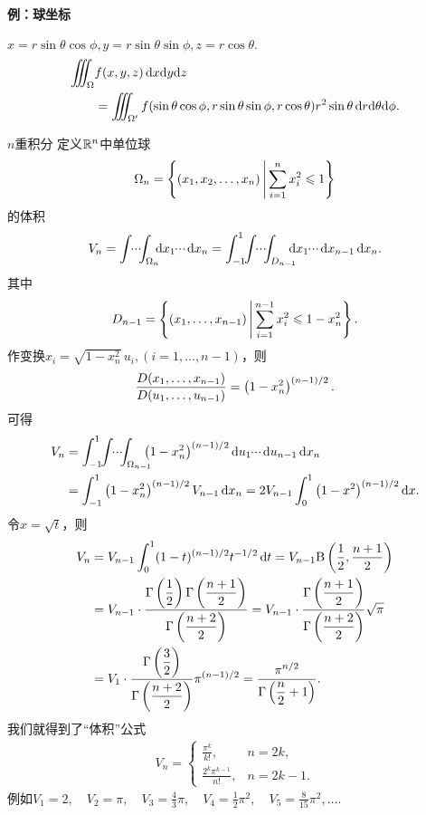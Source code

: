\paragraph{例：球坐标}$x=r\sin\theta\cos\phi,y=r\sin\theta\sin\phi,z=r\cos\theta.$
\begin{align*}
	\inttt_\Omega & f(x,y,z)\d x\nd y\nd z                                                                                   \\
				  & =\inttt_{\Omega'}f(\sin\theta\cos\phi,r\sin\theta\sin\phi,r\cos\theta)r^2\sin\theta\d r\nd\theta\nd\phi.
\end{align*}
\begin{example}{$n$重积分}{}
	定义$\mathbb R^n$中单位球
	\[\Omega_n=\left\{(x_1,x_2,\ldots,x_n)\,\middle\vert\,\sum_{i=1}^nx_i^2\leqslant 1\right\}\]
	的体积
	\[V_n=\int\bs3\cdot\bs2\cdot\bs2\cdot\bs4\int_{\Omega_n}\bs5\d x_1\bs3\cdot\bs2\cdot\bs2\cdot\bs1\d x_n=\int_{-1}^1\bs3\int\bs3\cdot\bs2\cdot\bs2\cdot\bs4\int_{D_{n-1}}\bs8\d x_1\bs3\cdot\bs2\cdot\bs2\cdot\bs1\d x_{n-1}\d x_n.\]
	其中
	\[D_{n-1}=\left\{(x_1,\ldots,x_{n-1})\,\middle\vert\,\sum_{i=1}^{n-1}x_i^2\leqslant 1-x_n^2\right\}.\]
	作变换$x_i=\sqrt{1-x_n^2}\,u_i,(i=1,\ldots,n-1)$，则
	\[\frac{D(x_1,\ldots,x_{n-1})}{D(u_1,\ldots,u_{n-1})}=\left(1-x_n^2\right)^{\left(n-1\right)/2}.\]
	可得
	\begin{align*}
		V_n & =\int_{-1}^1\bs3\int\bs3\cdot\bs2\cdot\bs2\cdot\bs4\int_{\Omega_{n-1}}\bs8\left(1-x_n^2\right)^{\kh{n-1}/2}\d u_1\bs3\cdot\bs2\cdot\bs2\cdot\bs1\d u_{n-1}\d x_n \\
			& =\int_{-1}^1\left(1-x_n^2\right)^{\kh{n-1}/2}V_{n-1}\d x_n=2V_{n-1}\int_0^1\left(1-x^2\right)^{\kh{n-1}/2}\d x.
	\end{align*}
	令$x=\sqrt t$，则
	\begin{align*}
		V_n & =V_{n-1}\int_0^1(1-t)^{\left(n-1\right)/2}t^{-1/2}\mathop{}\!\mathrm{d} t=V_{n-1}\text B\left(\frac12,\frac{n+1}2\right)                                                                  \\
			& =V_{n-1}\cdot\frac{\displaystyle \Gamma\left(\frac12\right)\Gamma\left(\frac{n+1}2\right)}{\displaystyle \Gamma\left(\frac{n+2}2\right)}=V_{n-1}\cdot\frac{\displaystyle \Gamma\left(\frac{n+1}2\right)}{\displaystyle \Gamma\left(\frac{n+2}2\right)}\sqrt\pi \\
			& =V_1\cdot\frac{\displaystyle \Gamma\left(\frac32\right)}{\displaystyle \Gamma\left(\frac{n+2}2\right)}\pi^{\left(n-1\right)/2}=\frac{\displaystyle \pi^{n/2}}{\displaystyle \Gamma\left(\frac n2+1\right)}.
	\end{align*}
	我们就得到了“体积”公式
	\begin{align}
		V_n=
		\begin{cases}
			\frac{\pi^k}{k!},        & n=2k,   \\[2ex]
			\frac{2^k\pi^{k-1}}{n!}, & n=2k-1.
		\end{cases}
	\end{align}
	例如$V_1=2,\quad V_2=\pi,\quad V_3=\frac 43\pi,\quad V_4=\frac 12\pi^2,\quad V_5=\frac 8{15}\pi^2,\ldots.$
\end{example}
\clearpage
